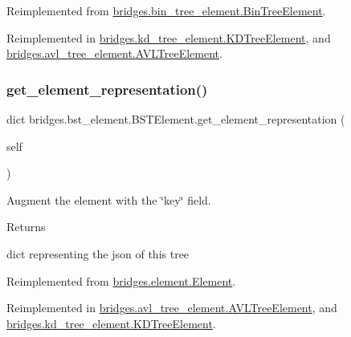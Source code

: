 Reimplemented from \mbox{\hyperlink{classbridges_1_1bin__tree__element_1_1_bin_tree_element_a9238744e18486fb8882238394f5efe7c}{bridges.\+bin\+\_\+tree\+\_\+element.\+Bin\+Tree\+Element}}.



Reimplemented in \mbox{\hyperlink{classbridges_1_1kd__tree__element_1_1_k_d_tree_element_a4b38af960542ccc8c3b74d90ee9570e2}{bridges.\+kd\+\_\+tree\+\_\+element.\+K\+D\+Tree\+Element}}, and \mbox{\hyperlink{classbridges_1_1avl__tree__element_1_1_a_v_l_tree_element_a811dd4cebd36fda6531f6cbeb873c0e5}{bridges.\+avl\+\_\+tree\+\_\+element.\+A\+V\+L\+Tree\+Element}}.

\mbox{\label{classbridges_1_1bst__element_1_1_b_s_t_element_a9d038f191a7cf06e75910463a3aa3b80}} 
\subsubsection{\texorpdfstring{get\_element\_representation()}{get\_element\_representation()}}
{\footnotesize\ttfamily  dict bridges.\+bst\+\_\+element.\+B\+S\+T\+Element.\+get\+\_\+element\+\_\+representation (\begin{DoxyParamCaption}\item[{}]{self }\end{DoxyParamCaption})}



Augment the element with the \char`\"{}key\char`\"{} field. 

\begin{DoxyReturn}{Returns}


dict representing the json of this tree 
\end{DoxyReturn}


Reimplemented from \mbox{\hyperlink{classbridges_1_1element_1_1_element_a511fbc6323616d806ae0ae33010f4654}{bridges.\+element.\+Element}}.



Reimplemented in \mbox{\hyperlink{classbridges_1_1avl__tree__element_1_1_a_v_l_tree_element_abf8842cb462f1e31f0889d67fb0d70d4}{bridges.\+avl\+\_\+tree\+\_\+element.\+A\+V\+L\+Tree\+Element}}, and \mbox{\hyperlink{classbridges_1_1kd__tree__element_1_1_k_d_tree_element_a4e08a6f2e4ff70be2b0dfd6eacdcf10e}{bridges.\+kd\+\_\+tree\+\_\+element.\+K\+D\+Tree\+Element}}.

